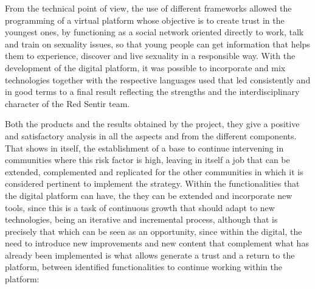 \documentclass[journal,transmag]{IEEEtran}
\begin{document}

From the technical point of view, the use of different frameworks allowed the programming of a virtual platform whose objective is to create trust in the youngest ones, by functioning as a social network oriented directly to work, talk and train on sexuality issues, so that young people can get information that helps them to experience, discover and live sexuality in a responsible way. With the development of the digital platform, it was possible to incorporate and mix technologies together with the respective languages used that led consistently and in good terms to a final result reflecting the strengths and the interdisciplinary character of the Red Sentir team.

Both the products and the results obtained by the project, they give a positive and satisfactory analysis in all the aspects and from the different components. That shows in itself, the establishment of a base to continue intervening in communities where this risk factor is high, leaving in itself a job that can be extended, complemented and replicated for the other communities in which it is considered pertinent to implement the strategy. Within the functionalities that the digital platform can have, the they can be extended and incorporate new tools, since this is a task of continuous growth that should adapt to new technologies, being an iterative and incremental process, although that is precisely that which can be seen as an opportunity, since within the digital, the need to introduce new improvements and new content that complement what has already been implemented is what allows generate a trust and a return to the platform, between identified functionalities to continue working within the platform:
\end{document}
